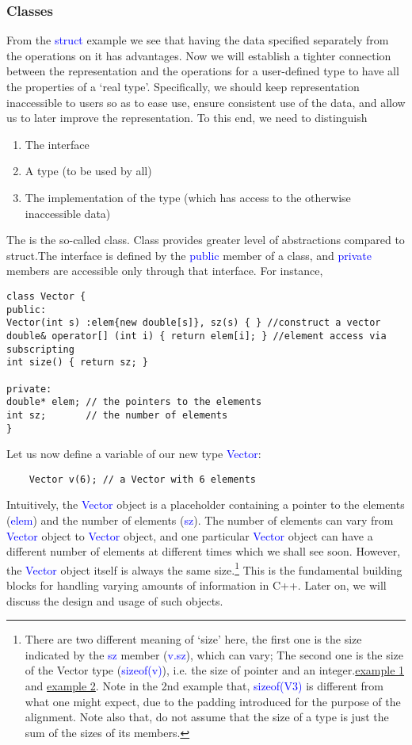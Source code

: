 \documentclass{article}
\newcommand{\be}[1]{\textcolor{blue}{#1}}
\begin{document}
\subsubsection{Classes}
From the \be{struct} example we see that having the data specified separately from the operations on it 
has advantages. Now we will establish a tighter connection between the representation and the operations for a user-defined type to have all the properties of a `real type'. Specifically, we should keep representation inaccessible to users so as to ease use, ensure consistent use of the data, and allow us to later improve the representation. To this end, we need to distinguish
\begin{enumerate}
	\item The interface
	\item A type (to be used by all)
	\item The implementation of the type (which has access to the otherwise inaccessible data)
\end{enumerate}
The is the so-called class. Class provides greater level of abstractions compared to struct.The interface is defined by the \be{public} member of a class, and \be{private} members are accessible only through that interface. For instance,
\begin{verbatim}
class Vector {
public:
Vector(int s) :elem{new double[s]}, sz(s) { } //construct a vector
double& operator[] (int i) { return elem[i]; } //element access via subscripting
int size() { return sz; }

private:
double* elem; // the pointers to the elements
int sz;       // the number of elements	
}
\end{verbatim}
Let us now define a variable of our new type \be{Vector}:
\begin{verbatim}
	Vector v(6); // a Vector with 6 elements
\end{verbatim}
Intuitively, the \be{Vector} object is a placeholder containing a pointer to the elements (\be{elem}) and the number of elements (\be{sz}). The number of elements can vary from \be{Vector} object to \be{Vector} object, and one particular \be{Vector} object can have a different number of elements at different times which we shall see soon. However, the \be{Vector} object itself is always the same size.\footnote{There are two different meaning of `size' here, the first one is the size indicated by the \be{sz} member (\be{v.sz}), which can vary; The second one is the size of the Vector type (\be{sizeof(v)}), i.e. the size of pointer and an integer.\href{https://godbolt.org/z/PM6437}{example 1} and \href{https://godbolt.org/z/GsW74s}{example 2}. Note in the 2nd example that, \be{sizeof(V3)} is different from what one might expect, due to the padding introduced for the purpose of the alignment. Note also that, do not assume that the size of a type is just the sum of the sizes of its members.} This is the fundamental building blocks for handling varying amounts of information in C++. Later on, we will discuss the design and usage of such objects.
\end{document}
